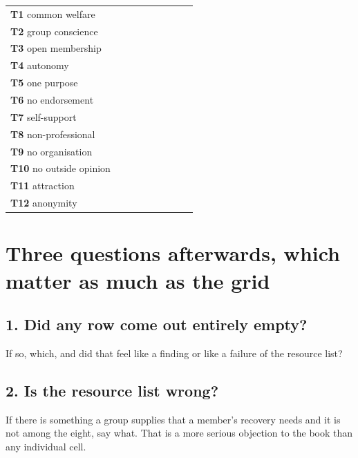 \documentclass[11pt]{article}
\begin{document}
\vspace{6pt}
\noindent
\renewcommand{\arraystretch}{2.0}
\setlength{\tabcolsep}{2pt}
\begin{tabular}{@{}p{44mm}|G|G|G|G|G|G|G|G@{}}
 &  &  & 
 &  &  & 
 &  &  \\[10pt]
\hline
\textbf{T1} common welfare    & & & & & & & & \\ \hline
\textbf{T2} group conscience  & & & & & & & & \\ \hline
\textbf{T3} open membership   & & & & & & & & \\ \hline
\textbf{T4} autonomy          & & & & & & & & \\ \hline
\textbf{T5} one purpose       & & & & & & & & \\ \hline
\textbf{T6} no endorsement    & & & & & & & & \\ \hline
\textbf{T7} self-support      & & & & & & & & \\ \hline
\textbf{T8} non-professional  & & & & & & & & \\ \hline
\textbf{T9} no organisation   & & & & & & & & \\ \hline
\textbf{T10} no outside opinion & & & & & & & & \\ \hline
\textbf{T11} attraction       & & & & & & & & \\ \hline
\textbf{T12} anonymity        & & & & & & & & \\ \hline
\end{tabular}

\clearpage
\section{Three questions afterwards, which matter as much as the grid}

\subsection{1. Did any row come out entirely empty?}
If so, which, and did that feel like a finding or like a failure of the resource list?
\answerlines[5]

\subsection{2. Is the resource list wrong?}
If there is something a group supplies that a member's recovery needs and it is not among the
eight, say what. That is a more serious objection to the book than any individual cell.
\answerlines[5]
\end{document}
